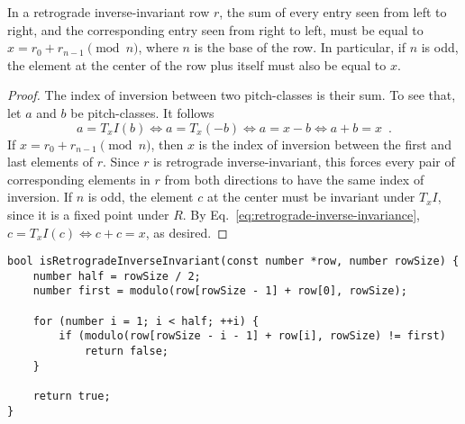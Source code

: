 \begin{lemma}
	\label{retrograde-inverse-invariance}
	In a retrograde inverse-invariant row $r$, the sum of every entry seen from left to right, and the corresponding entry seen from right to left, must be equal to $x = r_0 + r_{n - 1} \pmod{n}$, where $n$ is the base of the row. In particular, if $n$ is odd, the element at the center of the row plus itself must also be equal to $x$. 
	\begin{proof}
	The index of inversion between two pitch-classes is their sum. To see that, let $a$ and $b$ be pitch-classes. It follows
	\begin{equation}
		a = T_xI(b) \iff a = T_x(-b) \iff a = x - b \iff a + b = x \enspace .
	\label{eq:retrograde-inverse-invariance}
	\end{equation}
	If $x = r_0 + r_{n - 1} \pmod{n}$, then $x$ is the index of inversion between the first and last elements of $r$. Since $r$ is retrograde inverse-invariant, this forces every pair of corresponding elements in $r$ from both directions to have the same index of inversion. If $n$ is odd, the element $c$ at the center must be invariant under $T_xI$, since it is a fixed point under $R$. By Eq.~\ref{eq:retrograde-inverse-invariance}, $c = T_xI(c) \iff c + c = x$, as desired.
	\end{proof}
\end{lemma}

\begin{lstlisting}[caption={Determining whether a row is retrograde inverse-invariant.},label={isRetrogradeInverseInvariant}]
bool isRetrogradeInverseInvariant(const number *row, number rowSize) {
    number half = rowSize / 2;
    number first = modulo(row[rowSize - 1] + row[0], rowSize);

    for (number i = 1; i < half; ++i) {
        if (modulo(row[rowSize - i - 1] + row[i], rowSize) != first)
            return false;
    }

    return true;
}
\end{lstlisting}

